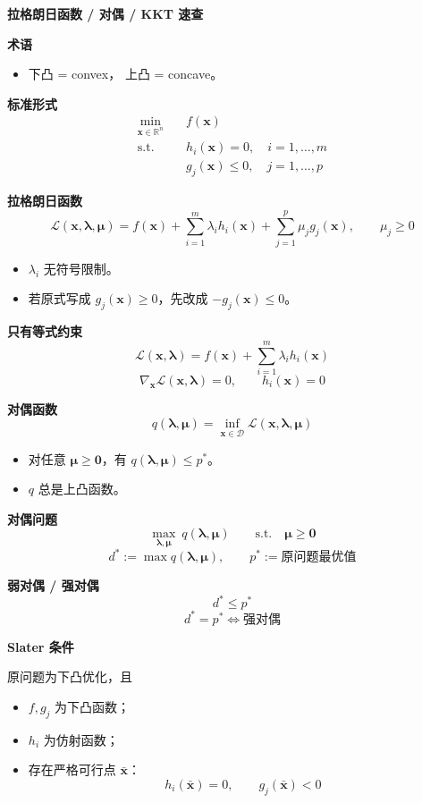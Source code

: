 \textbf{拉格朗日函数 / 对偶 / KKT 速查}

\textbf{术语}
\begin{itemize}
	\item 下凸 = convex， 上凸 = concave。
\end{itemize}

\textbf{标准形式}
\[
\begin{aligned}
\min_{\mathbf{x}\in\mathbb R^n}\quad & f(\mathbf{x}) \\
\text{s.t.}\quad & h_i(\mathbf{x})=0,\quad i=1,\dots,m \\
& g_j(\mathbf{x})\le 0,\quad j=1,\dots,p
\end{aligned}
\]

\textbf{拉格朗日函数}
\[
\mathcal L(\mathbf{x},\boldsymbol{\lambda},\boldsymbol{\mu})
=f(\mathbf{x})+\sum_{i=1}^m \lambda_i h_i(\mathbf{x})+\sum_{j=1}^p \mu_j g_j(\mathbf{x}),
\qquad \mu_j\ge 0
\]
\begin{itemize}
	\item $\lambda_i$ 无符号限制。
	\item 若原式写成 $g_j(\mathbf{x})\ge 0$，先改成 $-g_j(\mathbf{x})\le 0$。
\end{itemize}

\textbf{只有等式约束}
\[
\mathcal L(\mathbf{x},\boldsymbol{\lambda})=f(\mathbf{x})+\sum_{i=1}^m \lambda_i h_i(\mathbf{x})
\]
\[
\nabla_{\mathbf{x}}\mathcal L(\mathbf{x},\boldsymbol{\lambda})=0,\qquad h_i(\mathbf{x})=0
\]

\textbf{对偶函数}
\[
q(\boldsymbol{\lambda},\boldsymbol{\mu})
=\inf_{\mathbf{x}\in\mathcal D}\mathcal L(\mathbf{x},\boldsymbol{\lambda},\boldsymbol{\mu})
\]
\begin{itemize}
	\item 对任意 $\boldsymbol{\mu}\ge \mathbf{0}$，有 $q(\boldsymbol{\lambda},\boldsymbol{\mu})\le p^*$。
	\item $q$ 总是上凸函数。
\end{itemize}

\textbf{对偶问题}
\[
\max_{\boldsymbol{\lambda},\boldsymbol{\mu}}\ q(\boldsymbol{\lambda},\boldsymbol{\mu})
\qquad \text{s.t.}\quad \boldsymbol{\mu}\ge \mathbf{0}
\]
\[
d^*:=\max q(\boldsymbol{\lambda},\boldsymbol{\mu}),\qquad p^*:=\text{原问题最优值}
\]

\textbf{弱对偶 / 强对偶}
\[
d^*\le p^*
\]
\[
d^*=p^* \iff \text{强对偶}
\]

\textbf{Slater 条件}

原问题为下凸优化，且
\begin{itemize}
	\item $f,g_j$ 为下凸函数；
	\item $h_i$ 为仿射函数；
	\item 存在严格可行点 $\bar{\mathbf{x}}$：
	\[
	h_i(\bar{\mathbf{x}})=0,\qquad g_j(\bar{\mathbf{x}})<0
	\]
\end{itemize}

